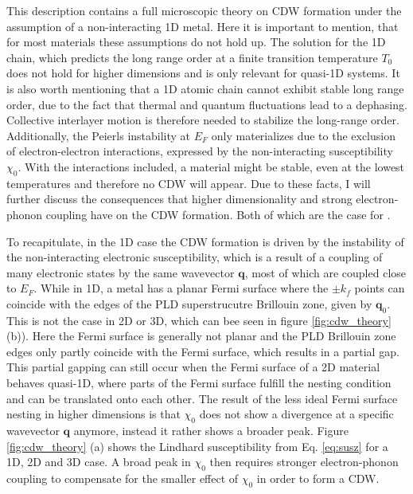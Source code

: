 This description contains a full microscopic theory on CDW formation under the assumption of a non-interacting 1D metal.
Here it is important to mention, that for most materials these assumptions do not hold up.
The solution for the 1D chain, which predicts the long range order at a finite transition temperature $T_0$ does not hold for higher dimensions and is only relevant for quasi-1D systems.
It is also worth mentioning that a 1D atomic chain cannot exhibit stable long range order, due to the fact that thermal and quantum fluctuations lead to a dephasing.
Collective interlayer motion is therefore needed to stabilize the long-range order.
Additionally, the Peierls instability at $E_F$ only materializes due to the exclusion of electron-electron interactions, expressed by the non-interacting susceptibility $\chi_0$.
With the interactions included, a material might be stable, even at the lowest temperatures and therefore no CDW will appear.
Due to these facts, I will further discuss the consequences that higher dimensionality and strong electron-phonon coupling have on the CDW formation.
Both of which are the case for .

To recapitulate, in the 1D case the CDW formation is driven by the instability of the non-interacting electronic susceptibility, which is a result of a coupling of many electronic states by the same wavevector $\mathbf{q}$, most of which are coupled close to $E_F$.
While in 1D, a metal has a planar Fermi surface where the $\pm k_f$ points can coincide with the edges of the PLD superstrucutre Brillouin zone, given by $\mathbf{q}_0$.
This is not the case in 2D or 3D, which can bee seen in figure \ref{fig:cdw_theory} (b)).
Here the Fermi surface is generally not planar and the PLD Brillouin zone edges only partly coincide with the Fermi surface, which results in a partial gap.
This partial gapping can still occur when the Fermi surface of a 2D material behaves quasi-1D, where parts of the Fermi surface fulfill the nesting condition and can be translated onto each other.
The result of the less ideal Fermi surface nesting in higher dimensions is that $\chi_0$ does not show a divergence at a specific wavevector $\mathbf{q}$ anymore, instead it rather shows a broader peak.
Figure \ref{fig:cdw_theory} (a) shows the Lindhard susceptibility from Eq. \ref{eq:susz} for a 1D, 2D and 3D case.
A broad peak in $\chi_0$ then requires stronger electron-phonon coupling to compensate for the smaller effect of $\chi_0$ in order to form a CDW.

